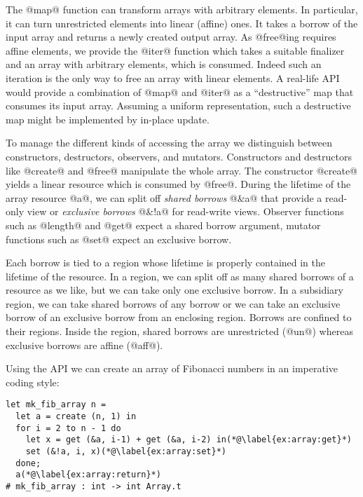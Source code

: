 The @map@ function can transform arrays with arbitrary elements. In 
particular, it can turn unrestricted elements into linear (affine)
ones. It takes a borrow of the input array and returns a newly created
output array. As @free@ing requires affine elements, we provide the
@iter@ function which takes a
suitable finalizer and an array with arbitrary elements, which is
consumed. Indeed such an iteration is the only way to free an array
with linear elements. A real-life
API would provide a combination of @map@ and @iter@ as a
``destructive'' map that consumes its input array. Assuming a uniform
representation, such a destructive map might be implemented by
in-place update.

To manage the different kinds of accessing the array we distinguish between constructors, destructors,
observers, and mutators.
Constructors and destructors like @create@ and @free@ manipulate the whole
array. %
The constructor
@create@ yields a linear resource which is consumed by @free@.
During the lifetime of the array resource @a@, we can split
off \emph{shared borrows} @&a@ that provide a read-only
view or \emph{exclusive borrows} @&!a@ for read-write views.
Observer functions such as @length@ and @get@ expect a shared borrow
argument, mutator functions such as @set@ expect
an exclusive borrow.

Each borrow is tied to a region whose lifetime is properly
contained in the lifetime of the resource.
In a region, we can split off as many shared borrows of a resource as
we like, but we can take only one exclusive borrow. In a
subsidiary region, we can take shared borrows of any
borrow or we can take an exclusive borrow of an exclusive borrow from an
enclosing region. Borrows are confined to their regions. Inside the region,
shared borrows are unrestricted (@un@) whereas exclusive
borrows are affine (@aff@).

Using the API 
we can create an
array of Fibonacci numbers in an imperative coding style:
\begin{lstlisting}
let mk_fib_array n =
  let a = create (n, 1) in
  for i = 2 to n - 1 do
    let x = get (&a, i-1) + get (&a, i-2) in(*@\label{ex:array:get}*)
    set (&!a, i, x)(*@\label{ex:array:set}*)
  done;
  a(*@\label{ex:array:return}*)
# mk_fib_array : int -> int Array.t
\end{lstlisting}

